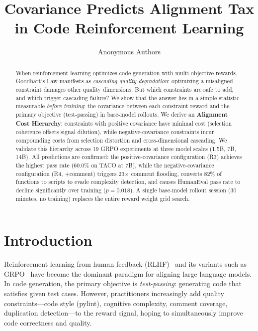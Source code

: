 \documentclass{article}
\title{Covariance Predicts Alignment Tax in Code Reinforcement Learning}
\author{
  Anonymous Authors
}
\begin{document}
\maketitle

\begin{abstract}
When reinforcement learning optimizes code generation with multi-objective rewards, Goodhart's Law manifests as \emph{cascading quality degradation}: optimizing a misaligned constraint damages other quality dimensions. But which constraints are safe to add, and which trigger cascading failure? We show that the answer lies in a simple statistic measurable \emph{before training}: the covariance between each constraint reward and the primary objective (test-passing) in base-model rollouts. We derive an \textbf{Alignment Cost Hierarchy}: constraints with positive covariance have minimal cost (selection coherence offsets signal dilution), while negative-covariance constraints incur compounding costs from selection distortion and cross-dimensional cascading. We validate this hierarchy across 19 GRPO experiments at three model scales (1.5B, 7B, 14B). All predictions are confirmed: the positive-covariance configuration (R3) achieves the highest pass rate (60.0\% on TACO at 7B), while the negative-covariance configuration (R4, +comment) triggers 23$\times$ comment flooding, converts 82\% of functions to scripts to evade complexity detection, and causes HumanEval pass rate to decline significantly over training ($p=0.018$). A single base-model rollout session (30 minutes, no training) replaces the entire reward weight grid search.
\end{abstract}

\section{Introduction}
\label{sec:intro}

Reinforcement learning from human feedback (RLHF)~\citep{ouyang2022training} and its variants such as GRPO~\citep{shao2024deepseekmath} have become the dominant paradigm for aligning large language models. In code generation, the primary objective is \emph{test-passing}: generating code that satisfies given test cases. However, practitioners increasingly add quality constraints---code style (pylint), cognitive complexity, comment coverage, duplication detection---to the reward signal, hoping to simultaneously improve code correctness and quality.
\end{document}
